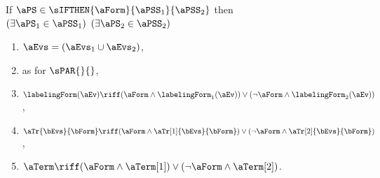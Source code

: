 \begin{figure}
  \noindent
  If $\aPS \in \sIFTHEN{\aForm}{\aPSS_1}{\aPSS_2}$ then
  $(\exists\aPS_1\in\aPSS_1)$ $(\exists\aPS_2\in\aPSS_2)$
  \begin{multicols}{2}
    \begin{enumerate}[topsep=0pt,label=(\textsc{i}\arabic*),ref=\textsc{i}\arabic*]
    \item \label{if-E}
      $\aEvs = (\aEvs_1\cup\aEvs_2)$,
    \item \label{if-lambda}
      \;
      \;
      \;
      \; as for $\sPAR{}{}$,
    \item \label{if-kappa}
      $\labelingForm(\aEv) \riff (\aForm\land\labelingForm_1(\aEv))\lor(\neg\aForm\land\labelingForm_2(\aEv))$,
    \item \label{if-tau}
      $\aTr{\bEvs}{\bForm} \riff (\aForm\land\aTr[1]{\bEvs}{\bForm})\lor(\neg\aForm\land\aTr[2]{\bEvs}{\bForm})$,
    \item \label{if-term}
      $\aTerm \riff (\aForm\land\aTerm[1])\lor(\neg\aForm\land\aTerm[2])$.
    \end{enumerate}
  \end{multicols}
  \medskip


\end{figure}
